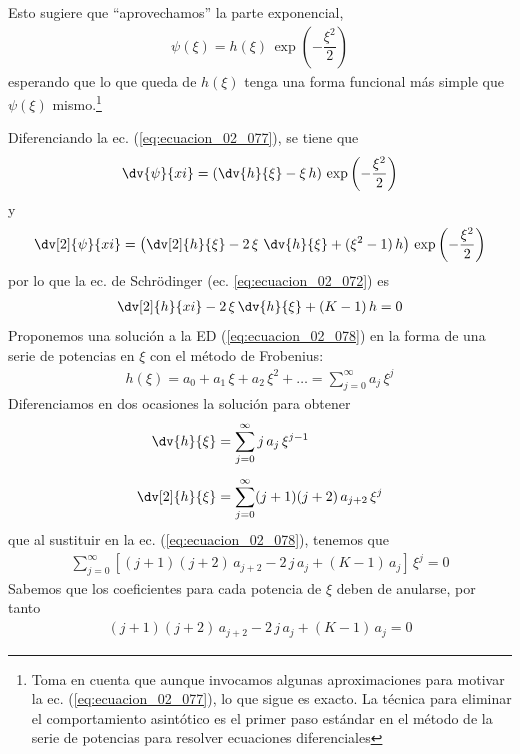 Esto sugiere que \enquote{aprovechamos} la parte exponencial,
\begin{align}
\psi (\xi) = h (\xi) \, \exp \left( - \dfrac{\xi^{2}}{2} \right)
\label{eq:ecuacion_02_077}
\end{align}
esperando que lo que queda de $h (\xi)$ tenga una forma funcional más simple que $\psi (\xi)$ mismo.\footnote{Toma en cuenta que aunque invocamos algunas aproximaciones para motivar la ec. (\ref{eq:ecuacion_02_077}), lo que sigue es exacto. La técnica para eliminar el comportamiento asintótico es el primer paso estándar en el método de la serie de potencias para resolver ecuaciones diferenciales}
\par
Diferenciando la ec. (\ref{eq:ecuacion_02_077}), se tiene que
\begin{align*}
\dv{\psi}{xi} = \left( \dv{h}{\xi} - \xi \, h \right) \, \exp \left( - \dfrac{\xi^{2}}{2} \right)
\end{align*}
y
\begin{align*}
\dv[2]{\psi}{xi} = \left( \dv[2]{h}{\xi} - 2  \,  \xi \, \, \dv{h}{\xi} + (\xi^{2} - 1) \, h \right) \, \exp \left( - \dfrac{\xi^{2}}{2} \right)
\end{align*}
por lo que la ec. de Schrödinger (ec. \ref{eq:ecuacion_02_072}) es
\begin{align}
\dv[2]{h}{xi} - 2 \, \xi \, \dv{h}{\xi} +  (K - 1) \, h = 0
\label{eq:ecuacion_02_078}
\end{align}
Proponemos una solución a la ED (\ref{eq:ecuacion_02_078}) en la forma de una serie de potencias en $\xi$ con el método de Frobenius:
\begin{align}
h (\xi) = a_{0} + a_{1} \, \xi + a_{2} \, \xi^{2} + \ldots = \sum_{j=0}^{\infty} a_{j} \, \xi^{j}
\label{eq:ecuacion_02_079}
\end{align}
Diferenciamos en dos ocasiones la solución para obtener
\begin{align*}
\dv{h}{\xi} &= \sum_{j=0}^{\infty} j \, a_{j} \, \xi^{j-1} \\[0.5em]
\dv[2]{h}{\xi} &= \sum_{j=0}^{\infty} (j + 1)(j + 2) \, a_{j+2} \, \xi^{j}
\end{align*}
que al sustituir en la ec. (\ref{eq:ecuacion_02_078}), tenemos que
\begin{align}
\sum_{j=0}^{\infty} [ (j + 1)(j + 2) \, a_{j+2} - 2 \, j \, a_{j} +  (K - 1) \, a_{j} ] \, \xi^{j} = 0
\label{eq:ecuacion_02_80}
\end{align}
Sabemos que los coeficientes para cada potencia de $\xi$ deben de anularse, por tanto
\begin{align*}
(j + 1)(j + 2) \, a_{j+2} - 2 \, j \, a_{j} +  (K - 1) \, a_{j} = 0
\end{align*}
